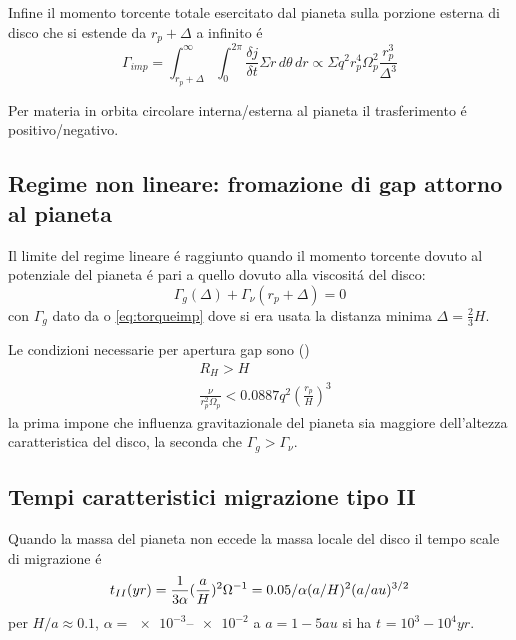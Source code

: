 Infine il momento torcente totale esercitato dal pianeta sulla porzione esterna di disco che si estende da $r_p+\Delta$ a infinito \'e
\begin{equation}
\Gamma_{imp}=\int_{r_p+\Delta}^{\infty}\int_0^{2\pi}\frac{\delta j}{\delta t}\Sigma r\,d\theta\,dr\propto\Sigma q^2r_p^4\Omega_p^2\frac{r_p^3}{\Delta^3}\label{eq:torqueimp}
\end{equation}

Per materia in orbita circolare interna/esterna al pianeta il trasferimento \'e positivo/negativo.

\subsection{Regime non lineare: fromazione di gap attorno al pianeta}

Il limite del regime lineare  \'e raggiunto quando il momento torcente dovuto al potenziale del pianeta \'e pari a quello dovuto alla viscosit\'a del disco:
\begin{equation}
\Gamma_g(\Delta)+\Gamma_{\nu}(r_p+\Delta)=0
\end{equation}
con $\Gamma_g$ dato da o \eqref{eq:torqueimp} dove si era usata la distanza minima $\Delta=\frac{2}{3}H$.

Le condizioni necessarie per apertura gap sono (\cite{papaloizoulin1984})
\begin{align}
&R_H>H\\
&\frac{\nu}{r_p^2\Omega_p}<0.0887q^2(\frac{r_p}{H})^3
\end{align}
la prima impone che influenza gravitazionale del pianeta sia maggiore dell'altezza caratteristica del disco, la seconda che $\Gamma_g>\Gamma_{\nu}$.

\subsection{Tempi caratteristici migrazione tipo II}

Quando la massa del pianeta non eccede la massa locale del disco il tempo scale di migrazione \'e
\begin{equation}
t_{II}(yr)=\frac{1}{3\alpha}(\frac{a}{H})^2\Omega^{-1}=0.05/\alpha(a/H)^2(a/au)^{3/2}
\end{equation}
per $H/a\approx0.1$, $\alpha=\numrange{e-3}{e-2}$ a $a=1-5 au$ si ha $t_{}=10^3-10^4yr$.

